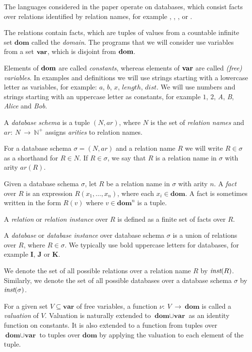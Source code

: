 The languages considered in the paper operate on databases, which consist facts over relations identified by relation names, for example , , ,  or .

The relations contain facts, which are tuples of values from a countable infinite set $\textbf{dom}$ called the \emph{domain}. The programs that we will consider use variables from a set $\bf{var}$, which is disjoint from $\bf{dom}$. 

Elements of $\bf{dom}$ are called \emph{constants}, whereas elements of $\bf{var}$ are called \emph{(free) variables}.
In examples and definitions we will use strings starting with a lowercase letter as variables, for example: $a$, $b$, $x$, $length$, $dist$. We will use numbers and strings starting with an uppercase letter as constants, for example $1$, $2$, \textit{A}, \textit{B}, \textit{Alice} and \textit{Bob}.

\begin{defn}

A \emph{database schema} is a tuple $(N, ar)$, where $N$ is the set of \emph{relation names} and $ar:~N~\to~\mathbb{N}^+$ assigns \emph{arities} to relation names. 

For a database schema $\sigma = (N, ar)$ and a relation name $R$ we will write $R \in \sigma$ as a shorthand for $R \in N$. If $R \in \sigma$, we say that $R$ is a relation name in $\sigma$ with arity $ar(R)$.

Given a database schema $\sigma$, let $R$ be a relation name in $\sigma$ with arity $n$. A \emph{fact} over $R$ is an expression $R(x_1 , \dots , x_n)$, where each $x_i \in \textbf{dom}$. A fact is sometimes written in the form $R(v)$ where $v \in \textbf{dom}^n$ is a tuple.

A \emph{relation} or \emph{relation instance} over $R$ is defined as a finite set of facts over $R$.

A \emph{database} or \emph{database instance} over database schema $\sigma$ is a union of relations over $R$, where $R \in \sigma$. We typically use bold uppercase letters for databases, for example $\textbf{I}$, $\textbf{J}$ or $\textbf{K}$. 

We denote the set of all possible relations over a relation name $R$ by $\textit{inst}(R)$. Similarly, we denote the set of all possible databases over a database schema $\sigma$ by $\textit{inst}(\sigma)$.
\end{defn}

\begin{defn}[Valuation]
For a given set $V \subseteq \textbf{var}$ of free variables, a function $\nu:~V~\to~\textbf{dom}$ is called a \emph{valuation} of $V$.
Valuation is naturally extended to $\textbf{dom} \cup \textbf{var}$ as an identity function on constants. It is also extended to a function from tuples over $\textbf{dom} \cup \textbf{var}$ to tuples over $\textbf{dom}$ by applying the valuation to each element of the tuple.
\end{defn}

